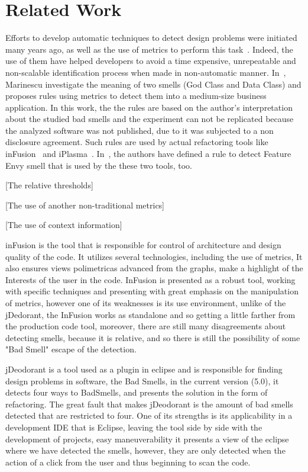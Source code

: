 \documentclass[conference]{IEEEtran}
\begin{document}
\section{Related Work}
\label{sec:related}

Efforts to develop automatic techniques to detect design problems were 
initiated many years ago, as well as the use of metrics to perform this task~\cite{Ciupke:1999}. Indeed, the use of them have helped developers to avoid a time expensive, unrepeatable and non-scalable identification process when made in non-automatic manner. In~\cite{Marinescu2001c}, Marinescu investigate the meaning of two smells (God Class and Data Class) and proposes rules using metrics to detect them into a medium-size business application. In this work, the the rules are based on the author's interpretation about the studied bad smells and the experiment can not be replicated because the analyzed software was not published, due to it was subjected to a non disclosure agreement. Such rules are used by actual refactoring tools like inFusion~\cite{inFusion} and iPlasma~\cite{iPlasma}. In~\cite{Lanza:2005}, the authors have defined a rule to detect Feature Envy smell that is used by the these two tools, too.

[The relative thresholds]

[The use of another non-traditional metrics]

[The use of context information]

inFusion is the tool that is responsible for control of architecture and design quality of the code.
It utilizes several technologies, including the use of metrics, It also
ensures views polimetricas advanced from the graphs, make a highlight of the Interests of the user
in the code. InFusion is presented as a robust tool, working with specific techniques and presenting 
with great emphasis on the manipulation of metrics, however one of its weaknesses is its use environment,
unlike of the jDedorant, the InFusion works as standalone and so getting a little farther from the production
code tool, moreover, there are still many disagreements about detecting smells, because it is relative,
and so there is still the possibility of some "Bad Smell" escape of the detection.

jDeodorant is a tool used as a plugin in eclipse and is responsible for finding design problems in 
software, the Bad Smells, in the current version (5.0), it detects four ways to BadSmells, and 
presents the solution in the form of refactoring. The great fault that makes jDeodorant is the amount
of bad smells detected that are restricted to four. One of its strengths is its applicability in a 
development IDE that is Eclipse, leaving the tool side by side with the development of projects, easy 
maneuverability it presents a view of the eclipse where we have detected the smells, however, they are 
only detected when the action of a click from the user and thus beginning to scan the code.
\end{document}
